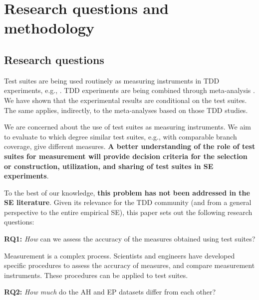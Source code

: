 \section{Research questions and methodology}\label{sec:objectives}

\subsection{Research questions}\label{sec:questions}

Test suites are being used routinely as measuring instruments in TDD experiments, e.g., \cite{Causevic2012,Desai2009,Erdogmus2005,Fucci2013}. TDD experiments are being combined through meta-analysis \cite{rafique2012effects}. We have shown that the experimental results are conditional on the test suites. The same applies, indirectly, to the meta-analyses based on those TDD studies. 

We are concerned about the use of test suites as measuring instruments. We aim to evaluate to which degree similar test suites, e.g., with comparable branch coverage, give different measures. \textbf{A better understanding of the role of test suites for measurement will provide decision criteria for the selection or construction, utilization, and sharing of test suites in SE experiments}.

To the best of our knowledge, \textbf{this problem has not been addressed in the SE literature}. Given its relevance for the TDD community (and from a general perspective to the entire empirical SE), this paper sets out the following research questions:

\vspace{0.8mm}

\textbf{RQ1:} \textit{How} can we assess the accuracy of the measures obtained using test suites?

\vspace{0.8mm}

Measurement is a complex process. Scientists and engineers have developed specific procedures to assess the accuracy of measures, and compare measurement instruments. These procedures can be applied to test suites.

\vspace{0.8mm}

\textbf{RQ2:} \textit{How much} do the AH and EP datasets differ from each other?

\vspace{0.8mm}

